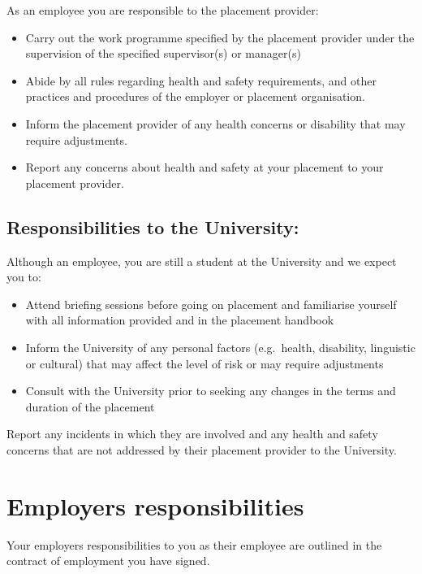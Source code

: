 \documentclass[
]{book}
\providecommand{\tightlist}{%
  \setlength{\itemsep}{0pt}\setlength{\parskip}{0pt}}
\begin{document}
As an employee you are responsible to the placement provider:

\begin{itemize}
\tightlist
\item
  Carry out the work programme specified by the placement provider under the supervision of the specified supervisor(s) or manager(s)
\item
  Abide by all rules regarding health and safety requirements, and other practices and procedures of the employer or placement organisation.
\item
  Inform the placement provider of any health concerns or disability that may require adjustments.
\item
  Report any concerns about health and safety at your placement to your placement provider.
\end{itemize}

\section{Responsibilities to the University:}\label{responsibilities-to-the-university}

Although an employee, you are still a student at the University and we expect you to:

\begin{itemize}
\tightlist
\item
  Attend briefing sessions before going on placement and familiarise yourself with all information provided and in the placement handbook
\item
  Inform the University of any personal factors (e.g.~health, disability, linguistic or cultural) that may affect the level of risk or may require adjustments
\item
  Consult with the University prior to seeking any changes in the terms and duration of the placement
\end{itemize}

Report any incidents in which they are involved and any health and safety concerns that are not addressed by their placement provider to the University.

\chapter{Employers responsibilities}\label{employers}

Your employers responsibilities to you as their employee are outlined in the contract of employment you have signed. \citep{contract}
\end{document}
